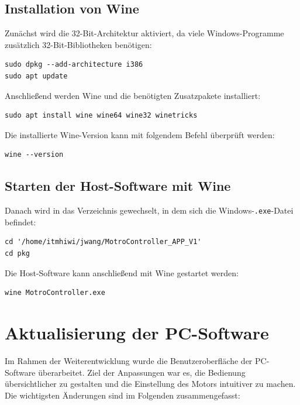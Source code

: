 \documentclass[a4paper,12pt]{article}
\begin{document}
\subsection{Installation von Wine}

Zunächst wird die 32-Bit-Architektur aktiviert, da viele Windows-Programme
zusätzlich 32-Bit-Bibliotheken benötigen:

\begin{verbatim}
sudo dpkg --add-architecture i386
sudo apt update
\end{verbatim}

Anschließend werden Wine und die benötigten Zusatzpakete installiert:

\begin{verbatim}
sudo apt install wine wine64 wine32 winetricks
\end{verbatim}

Die installierte Wine-Version kann mit folgendem Befehl überprüft werden:

\begin{verbatim}
wine --version
\end{verbatim}

\subsection{Starten der Host-Software mit Wine}

Danach wird in das Verzeichnis gewechselt, in dem sich die
Windows-\texttt{.exe}-Datei befindet:

\begin{verbatim}
cd '/home/itmhiwi/jwang/MotroController_APP_V1'
cd pkg
\end{verbatim}

Die Host-Software kann anschließend mit Wine gestartet werden:

\begin{verbatim}
wine MotroController.exe
\end{verbatim}


\section{Aktualisierung der PC-Software}

Im Rahmen der Weiterentwicklung wurde die Benutzeroberfläche der
PC-Software überarbeitet. Ziel der Anpassungen war es, die Bedienung
übersichtlicher zu gestalten und die Einstellung des Motors intuitiver
zu machen. Die wichtigsten Änderungen sind im Folgenden zusammengefasst:
\end{document}
